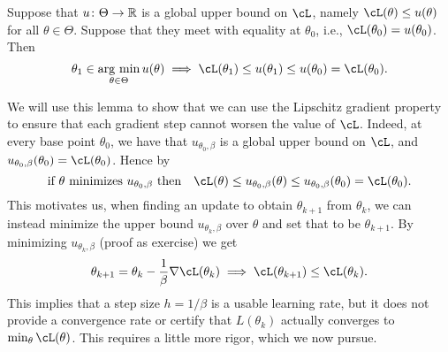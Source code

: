 \documentclass[../../book-main.tex]{subfiles}
\begin{document}
\begin{lemma}\label{lem:majorization_minimization}
    Suppose that \(u \colon \Theta \to \mathbb{R}\) is a global upper bound on \(\cL\), namely \(\cL(\theta) \leq u(\theta)\) for all \(\theta \in \Theta\). Suppose that they meet with equality at \(\theta_{0}\), i.e., \(\cL(\theta_{0}) = u(\theta_{0})\). Then
    \begin{equation}
        \theta_{1} \in \argmin_{\theta \in \Theta}u(\theta) \implies \cL(\theta_{1}) \leq u(\theta_{1}) \leq u(\theta_{0}) = \cL(\theta_{0}).
    \end{equation}
\end{lemma}

We will use this lemma to show that we can use the Lipschitz gradient property to ensure that each gradient step cannot worsen the value of \(\cL\). Indeed, at every base point \(\theta_{0}\), we have that \(u_{\theta_{0}, \beta}\) is a global upper bound on \(\cL\), and \(u_{\theta_{0}, \beta}(\theta_{0}) = \cL(\theta_{0})\). Hence by 
\begin{equation}
    \text{if \(\theta\) minimizes \(u_{\theta_{0}, \beta}\) then} \quad \cL(\theta) \leq u_{\theta_{0}, \beta}(\theta) \leq u_{\theta_{0}, \beta}(\theta_{0}) = \cL(\theta_{0}).
\end{equation}
This motivates us, when finding an update to obtain \(\theta_{k + 1}\) from \(\theta_{k}\), we can instead minimize the upper bound \(u_{\theta_{k}, \beta}\) over \(\theta\) and set that to be \(\theta_{k + 1}\). By minimizing \(u_{\theta_{k}, \beta}\) (proof as exercise) we get 
\begin{equation}
    \theta_{k + 1} = \theta_{k} - \frac{1}{\beta}\nabla \cL(\theta_{k}) \implies \cL(\theta_{k + 1}) \leq \cL(\theta_{k}).
\end{equation}
This implies that a step size \(h = 1/\beta\) is a usable learning rate, but it does not provide a convergence rate or certify that \(L(\theta_{k})\) actually converges to \(\min_{\theta}\cL(\theta)\). This requires a little more rigor, which we now pursue.
\end{document}
